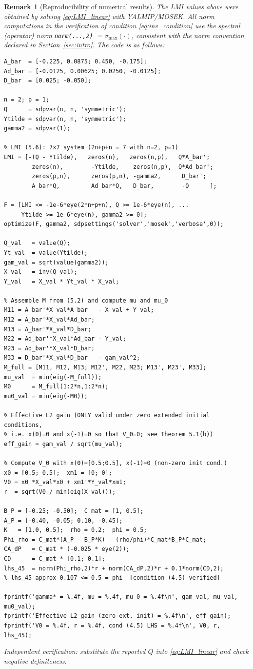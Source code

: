 \documentclass[10pt]{amsart}
\numberwithin{equation}{section}
\newtheorem{remark}[theorem]{Remark}
\begin{document}
\begin{remark}[Reproducibility of numerical results]\label{rem:reproducibility}
The LMI values above were obtained by solving \eqref{eq:LMI_linear} with YALMIP/MOSEK.
All norm computations in the verification of condition \eqref{eq:inv_condition} use the
spectral (operator) norm \texttt{norm(...,2)} $= \sigma_{\max}(\cdot)$, consistent with
the norm convention declared in Section~\ref{sec:intro}. The code is as follows:
\begin{verbatim}
A_bar  = [-0.225, 0.0875; 0.450, -0.175];
Ad_bar = [-0.0125, 0.00625; 0.0250, -0.0125];
D_bar  = [0.025; -0.050];

n = 2; p = 1;
Q      = sdpvar(n, n, 'symmetric');
Ytilde = sdpvar(n, n, 'symmetric');
gamma2 = sdpvar(1);

% LMI (5.6): 7x7 system (2n+p+n = 7 with n=2, p=1)
LMI = [-(Q - Ytilde),   zeros(n),   zeros(n,p),   Q*A_bar';
        zeros(n),        -Ytilde,    zeros(n,p),  Q*Ad_bar';
        zeros(p,n),      zeros(p,n), -gamma2,      D_bar';
        A_bar*Q,         Ad_bar*Q,   D_bar,        -Q      ];

F = [LMI <= -1e-6*eye(2*n+p+n), Q >= 1e-6*eye(n), ...
     Ytilde >= 1e-6*eye(n), gamma2 >= 0];
optimize(F, gamma2, sdpsettings('solver','mosek','verbose',0));

Q_val   = value(Q);
Yt_val  = value(Ytilde);
gam_val = sqrt(value(gamma2));
X_val   = inv(Q_val);
Y_val   = X_val * Yt_val * X_val;

% Assemble M from (5.2) and compute mu and mu_0
M11 = A_bar'*X_val*A_bar   - X_val + Y_val;
M12 = A_bar'*X_val*Ad_bar;
M13 = A_bar'*X_val*D_bar;
M22 = Ad_bar'*X_val*Ad_bar - Y_val;
M23 = Ad_bar'*X_val*D_bar;
M33 = D_bar'*X_val*D_bar   - gam_val^2;
M_full = [M11, M12, M13; M12', M22, M23; M13', M23', M33];
mu_val  = min(eig(-M_full));
M0      = M_full(1:2*n,1:2*n);
mu0_val = min(eig(-M0));

% Effective L2 gain (ONLY valid under zero extended initial conditions,
% i.e. x(0)=0 and x(-1)=0 so that V_0=0; see Theorem 5.1(b))
eff_gain = gam_val / sqrt(mu_val);

% Compute V_0 with x(0)=[0.5;0.5], x(-1)=0 (non-zero init cond.)
x0 = [0.5; 0.5];  xm1 = [0; 0];
V0 = x0'*X_val*x0 + xm1'*Y_val*xm1;
r  = sqrt(V0 / min(eig(X_val)));

B_P = [-0.25; -0.50];  C_mat = [1, 0.5];
A_P = [-0.40, -0.05; 0.10, -0.45];
K   = [1.0, 0.5];  rho = 0.2;  phi = 0.5;
Phi_rho = C_mat*(A_P - B_P*K) - (rho/phi)*C_mat*B_P*C_mat;
CA_dP   = C_mat * (-0.025 * eye(2));
CD      = C_mat * [0.1; 0.1];
lhs_45  = norm(Phi_rho,2)*r + norm(CA_dP,2)*r + 0.1*norm(CD,2);
% lhs_45 approx 0.107 <= 0.5 = phi  [condition (4.5) verified]

fprintf('gamma* = %.4f, mu = %.4f, mu_0 = %.4f\n', gam_val, mu_val, mu0_val);
fprintf('Effective L2 gain (zero ext. init) = %.4f\n', eff_gain);
fprintf('V0 = %.4f, r = %.4f, cond (4.5) LHS = %.4f\n', V0, r, lhs_45);
\end{verbatim}
Independent verification: substitute the reported $Q$ into \eqref{eq:LMI_linear} and
check negative definiteness.
\end{remark}
\end{document}
